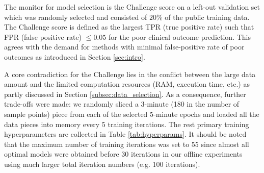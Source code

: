 The monitor for model selection is the Challenge score on a left-out validation set which was randomly selected and consisted of $20\%$ of the public training data. The Challenge score is defined as the largest TPR (true positive rate) such that FPR (false positive rate) $\le 0.05$ for the poor clinical outcome prediction. This agrees with the demand for methods with minimal false-positive rate of poor outcomes as introduced in Section \ref{sec:intro}.

A core contradiction for the Challenge lies in the conflict between the large data amount and the limited computation resources (RAM, execution time, etc.) as partly discussed in Section \ref{subsec:data_selection}. As a consequence, further trade-offs were made: we randomly sliced a 3-minute (180 in the number of sample points) piece from each of the selected 5-minute epochs and loaded all the data pieces into memory every 5 training iterations. The rest primary training hyperparameters are collected in Table \ref{tab:hyperparams}. It should be noted that the maximum number of training iterations was set to 55 since almost all optimal models were obtained before 30 iterations in our offline experiments using much larger total iteration numbers (e.g. 100 iterations).





